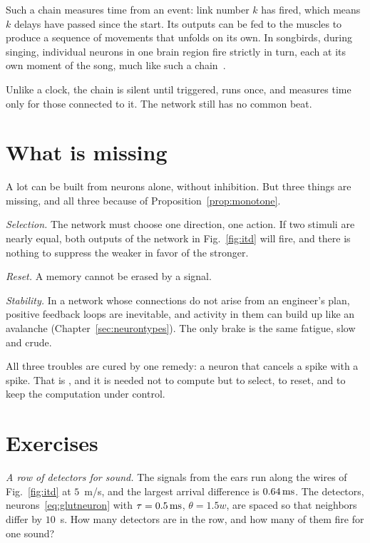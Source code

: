 Such a chain measures time from an event: link number $k$ has fired, which means $k$ delays have passed since the start. Its outputs can be fed to the muscles to produce a sequence of movements that unfolds on its own. In songbirds, during singing, individual  neurons in one brain region fire strictly in turn, each at its own moment of the song, much like such a chain~\cite{Hahnloser2002}.

Unlike a clock, the chain is silent until triggered, runs once, and measures time only for those connected to it. The network still has no common beat.

\section{What is missing}

A lot can be built from  neurons alone, without inhibition. But three things are missing, and all three because of Proposition~\ref{prop:monotone}.

\emph{Selection.} The network must choose one direction, one action. If two stimuli are nearly equal, both outputs of the network in Fig.~\ref{fig:itd} will fire, and there is nothing to suppress the weaker in favor of the stronger.

\emph{Reset.} A memory cannot be erased by a signal.

\emph{Stability.} In a network whose connections do not arise from an engineer's plan, positive feedback loops are inevitable, and activity in them can build up like an avalanche (Chapter~\ref{sec:neurontypes}). The only brake is the same fatigue, slow and crude.

All three troubles are cured by one remedy: a neuron that cancels a spike with a spike. That is , and it is needed not to compute but to select, to reset, and to keep the computation under control.

\section{Exercises}

\begin{exercise}[\lvlA]
\label{ex:02:1}
\emph{A row of detectors for sound.} The signals from the ears run along the wires of Fig.~\ref{fig:itd} at $5$~m/s, and the largest arrival difference is $0.64\,\text{ms}$. The detectors, neurons~\eqref{eq:glutneuron} with $\tau=0.5\,\text{ms}$, $\theta=1.5w$, are spaced so that neighbors differ by $10$~\textmu s. How many detectors are in the row, and how many of them fire for one sound?
\end{exercise}

